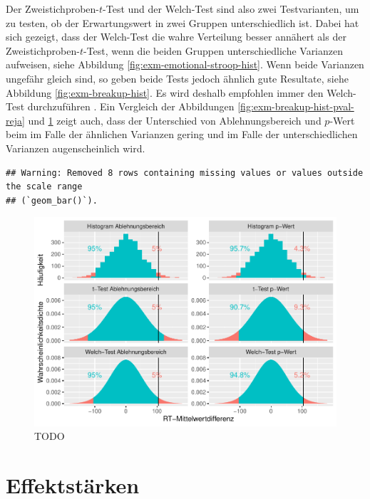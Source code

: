 \documentclass[
]{book}
\theoremstyle{definition}
\theoremstyle{definition}
\theoremstyle{definition}
\theoremstyle{definition}
\theoremstyle{remark}
\begin{document}
Der Zweistichproben-\(t\)-Test und der Welch-Test sind also zwei Testvarianten, um zu testen, ob der Erwartungswert in zwei Gruppen unterschiedlich ist. Dabei hat sich gezeigt, dass der Welch-Test die wahre Verteilung besser annähert als der Zweistichproben-\(t\)-Test, wenn die beiden Gruppen unterschiedliche Varianzen aufweisen, siehe Abbildung \ref{fig:exm-emotional-stroop-hist}. Wenn beide Varianzen ungefähr gleich sind, so geben beide Tests jedoch ähnlich gute Resultate, siehe Abbildung \ref{fig:exm-breakup-hist}. Es wird deshalb empfohlen immer den Welch-Test durchzuführen \citep{zimmerman2004}. Ein Vergleich der Abbildungen \ref{fig:exm-breakup-hist-pval-reja} und \ref{fig:exm-emotional-stroop-hist-pval-reja} zeigt auch, dass der Unterschied von Ablehnungsbereich und \(p\)-Wert beim im Falle der ähnlichen Varianzen gering und im Falle der unterschiedlichen Varianzen augenscheinlich wird.

\begin{verbatim}
## Warning: Removed 8 rows containing missing values or values outside the scale range
## (`geom_bar()`).
\end{verbatim}

\begin{figure}

{\centering \includegraphics{aps_statistik1_files/figure-latex/exm-emotional-stroop-hist-pval-reja-1} 

}

\caption{TODO}\label{fig:exm-emotional-stroop-hist-pval-reja}
\end{figure}

\section{Effektstärken}\label{effektstuxe4rken}
\end{document}
